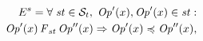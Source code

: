 \documentclass[journal,compsoc]{IEEEtran}
\begin{document}
\begin{align}\label{eqn:Causal}
\begin{split}
E^{s} = \forall \; \mathit{st} \in \mathcal{S}_t, \; {\mathit{Op}}'(x), {\mathit{Op}}'(x) \in \mathit{st} : \\
 {\mathit{Op}}'(x) \operatorname{\it F}_\mathit{st} {\mathit{Op}}''(x)
 \Rightarrow {\mathit{Op}}'(x) \preccurlyeq {\mathit{Op}}''(x), 
 \end{split}
  \end{align} %
\end{document}
